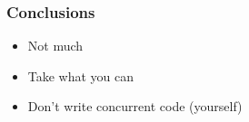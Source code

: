\documentclass[aspectratio=1610, xcolor={dvipsnames}]{beamer}
\begin{document}
\begin{frame}
    \frametitle{Conclusions}

    \begin{itemize}
        \item Not much
        \item Take what you can
        \item Don't write concurrent code (yourself)
    \end{itemize}

\end{frame}

\begin{frame}

    \printbibliography

\end{frame}
\end{document}

